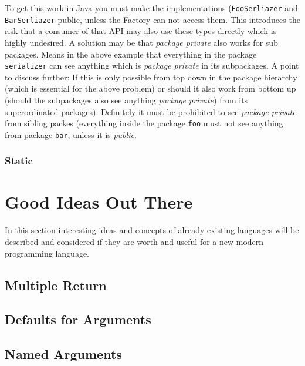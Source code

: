 \documentclass[11pt, a4paper]{report}
\begin{document}
To get this work in Java you must make the implementations (\texttt{FooSerliazer} and \texttt{BarSerliazer} public, unless the Factory can not access them. This introduces the risk that a consumer of that API may also use these types directly which is highly undesired. A solution may be that \textit{package private} also works for sub packages. Means in the above example that everything in the package \texttt{serializer} can see anything which is \textit{package private} in its subpackages. A point to discuss further: If this is only possible from top down in the package hierarchy (which is essential for the above problem) or should it also work from bottom up (should the subpackages also see anything \textit{package private}) from its superordinated packages). Definitely it must be prohibited to see \textit{package private} from sibling packes (everything inside the package \texttt{foo} must not see anything from package \texttt{bar}, unless it is \textit{public}.

\subsection{Static}


\chapter{Good Ideas Out There}

In this section interesting ideas and concepts of already existing languages will be described and considered if they are worth and useful for a new modern programming language.

\section{Multiple Return}


\section{Defaults for Arguments}


\section{Named Arguments}
\end{document}
